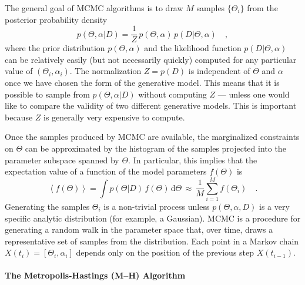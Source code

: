 \documentclass[12pt,preprint]{aastex}
\newcommand{\dd}{\mathrm{d}}
\renewcommand{\vector}[1]{#1}
\newcommand{\pr}[1]{\ensuremath{p(#1)}}
\newcommand{\expect}[1]{\left<#1\right>}
\newcommand{\model}{\ensuremath{\vector{\Theta}}}
\newcommand{\data}{\ensuremath{\vector{D}}}
\newcommand{\nuisance}{\ensuremath{\vector{\alpha}}}
\newcommand{\link}{\ensuremath{X}}
\begin{document}
The general goal of MCMC algorithms is to draw $M$ samples
$\{ \model_i \}$ from
the posterior probability density
\begin{equation}
    \pr{\model, \nuisance | \data} = \frac{1}{Z}\,\pr{\model, \nuisance}
            \, \pr{\data | \model, \nuisance} \quad,
\end{equation}
where the prior distribution $\pr{\model, \nuisance}$ and the likelihood
function $\pr{\data|\model,\nuisance}$ can be relatively easily (but not
necessarily quickly) computed for any particular value of
$(\model_i, \nuisance_i)$.  The normalization $Z=\pr{\data}$ is
independent of $\model$ and $\nuisance$ once we have chosen the form of the
generative model. This means that it is possible
to sample from \pr{\model, \nuisance | \data} without computing $Z$ ---
unless one would like to compare the validity of two different generative
models. This is important because $Z$ is generally very expensive to
compute.

Once the samples
produced by MCMC are available, the marginalized constraints on $\model$
can be approximated by
the histogram of the samples projected into the parameter subspace spanned
by $\model$. In particular, this implies that the
expectation value of a function of the model parameters $f(\model)$ is
\begin{equation}
    \expect{f(\model)} = \int
    \pr{\model|\data}
    \, f(\model) \, \dd\model
    \,\approx\, \frac{1}{M} \sum_{i=1} ^M f(\model_i) \quad.
\end{equation}
Generating the samples $\model_i$ is a non-trivial process unless
$\pr{\model, \nuisance, \data}$ is a very specific analytic distribution
(for example, a Gaussian). MCMC is a procedure for generating a random walk
in the parameter space that, over time, draws a representative set
of samples from the distribution. Each point in a Markov chain
$\link (t_i) = [\model_i, \nuisance_i]$
depends only on the position of the previous step $\link (t_{i-1})$.

\paragraph{The Metropolis-Hastings (M--H) Algorithm}
\end{document}
